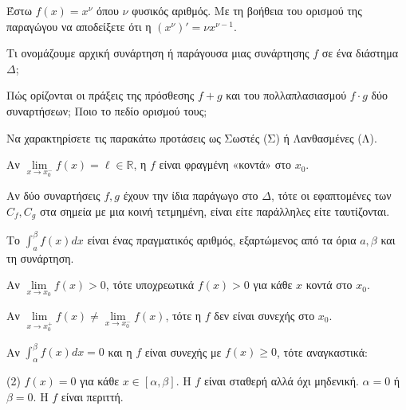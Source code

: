 \documentclass[11pt,a4paper]{article}
\newcommand{\kerkissans}[1]{{\fontfamily{maksf}\selectfont \textbf{#1}}}
\renewcommand{\textdexiakeraia}{}
\newcommand{\dint}{\displaystyle\int}
\newcommand\themanum{A}
\newcounter{thema}[section]
\renewcommand{\thethema}{\arabic{thema}}
\newcommand{\Thema}{\refstepcounter{thema}{\textbf{\textcolor{black}{\faPenSquare\ \  \large \kerkissans{\textbf{\thethemaο\hspace{2mm}Διαγώνισμα - Θέμα \themanum}}}}}\hspace{0mm}}{}
\newenvironment{thema}[1]
{\begin{tcolorbox}[title=\Thema\kerkissans{\textbf{\large{  #1}}},breakable,
enhanced standard,titlerule=0pt,toprule=0pt, rightrule=0pt, bottomrule=0pt,
colback=white,left=0mm,top=1mm,bottom=0mm,
boxrule=0pt,
colframe=white,leftrule=0mm,sharp corners,coltitle=black]
\renewcommand{\themanum}{#1}}
{\end{tcolorbox}}
\begin{document}
\begin{thema}{A}
\begin{erwthma}
    \item Έστω $f(x) = x^\nu$ όπου $\nu$ φυσικός αριθμός. Με τη βοήθεια του ορισμού της παραγώγου να αποδείξετε ότι η $(x^\nu)' = \nu x^{\nu - 1}$.
    \item Τι ονομάζουμε αρχική συνάρτηση ή παράγουσα μιας συνάρτησης $f$ σε ένα διάστημα $\Delta$;
    \item Πώς ορίζονται οι πράξεις της πρόσθεσης $f+g$ και του πολλαπλασιασμού $f \cdot g$ δύο συναρτήσεων; Ποιο το πεδίο ορισμού τους;
    \item Να χαρακτηρίσετε τις παρακάτω προτάσεις ως Σωστές (Σ) ή Λανθασμένες (Λ).
    \begin{alist}
        \item Αν $\lim\limits_{x\to x_0^-} f(x) = \ell \in \mathbb{R}$, η $f$ είναι φραγμένη «κοντά» στο $x_0$.
        \item Αν δύο συναρτήσεις $f, g$ έχουν την ίδια παράγωγο στο $\Delta$, τότε οι εφαπτομένες των $C_f, C_g$ στα σημεία με μια κοινή τετμημένη, είναι είτε παράλληλες είτε ταυτίζονται.
        \item Το $\dint_a^\beta f(x) dx$ είναι ένας πραγματικός αριθμός, εξαρτώμενος από τα όρια $a, \beta$ και τη συνάρτηση.
        \item Αν $\lim\limits_{x\to x_0} f(x) > 0$, τότε υποχρεωτικά $f(x) > 0$ για κάθε $x$ κοντά στο $x_0$.
        \item Αν $\lim\limits_{x\to x_0^+} f(x) \ne \lim\limits_{x\to x_0^-} f(x)$, τότε η $f$ δεν είναι συνεχής στο $x_0$.
    \end{alist}
    \item Αν $\dint_\alpha^\beta f(x) dx = 0$ και η $f$ είναι συνεχής με $f(x) \ge 0$, τότε αναγκαστικά:
    \begin{tasks}[label=\let\textdexiakeraia\relax\alph*.](2)
        \task $f(x) = 0$ για κάθε $x \in [\alpha, \beta]$.
        \task H $f$ είναι σταθερή αλλά όχι μηδενική.
        \task $\alpha = 0$ ή $\beta = 0$.
        \task H $f$ είναι περιττή.
    \end{tasks}
\end{erwthma}
\end{thema}
\vspace{1cm}
\end{document}
